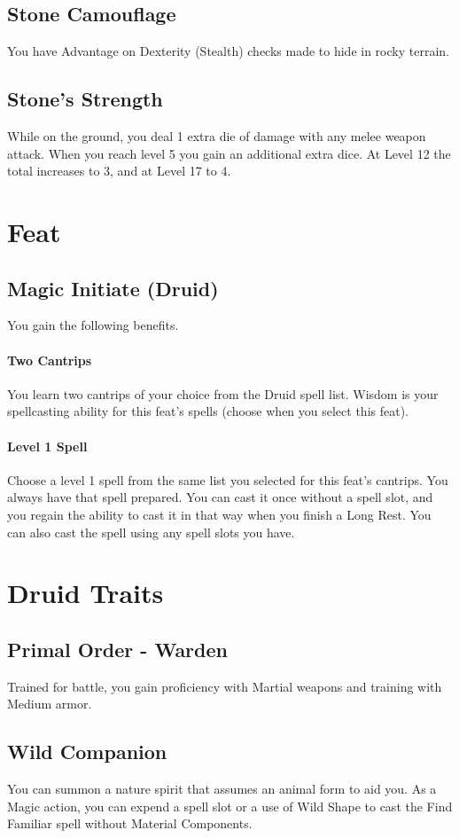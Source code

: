 \documentclass[letterpaper,openany,oneside,twocolumn]{book}
\begin{document}
\subsection*{Stone Camouflage}
You have Advantage on Dexterity (Stealth) checks made to hide in rocky terrain.
\subsection*{Stone's Strength}
While on the ground, you deal 1 extra die of damage with any melee weapon attack. When you reach level 5 you gain an additional extra dice. At Level 12 the total increases to 3, and at Level 17 to 4.

\section*{Feat}
\subsection*{Magic Initiate (Druid)}
You gain the following benefits.
\paragraph*{Two Cantrips} You learn two cantrips of your choice from the Druid spell list. Wisdom is your spellcasting ability for this feat's spells (choose when you select this feat).
\paragraph*{Level 1 Spell} Choose a level 1 spell from the same list you selected for this feat's cantrips. You always have that spell prepared. You can cast it once without a spell slot, and you regain the ability to cast it in that way when you finish a Long Rest. You can also cast the spell using any spell slots you have.

\section*{Druid Traits}
\subsection*{Primal Order - Warden}
Trained for battle, you gain proficiency with Martial weapons and training with Medium armor.

\subsection*{Wild Companion}
You can summon a nature spirit that assumes an animal form to aid you. As a Magic action, you can expend a spell slot or a use of Wild Shape to cast the Find Familiar spell without Material Components.
\end{document}
